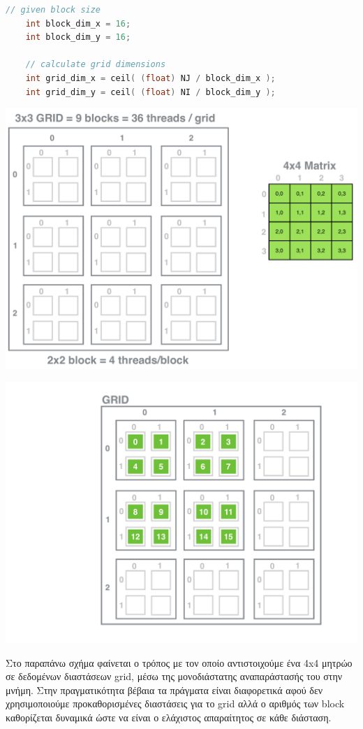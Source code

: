 \vspace{0.3cm}

\newpage

\begin{lstlisting}[language=C]
    // given block size
	int block_dim_x = 16;
	int block_dim_y = 16;

	// calculate grid dimensions
	int grid_dim_x = ceil( (float) NJ / block_dim_x );
	int grid_dim_y = ceil( (float) NI / block_dim_y );
\end{lstlisting}

\begin{center}
    \includegraphics[scale=0.35]{./figures/1_conv/grid-matrix}
\end{center}

\begin{center}
    \includegraphics[scale=0.35]{./figures/1_conv/final-grid}
\end{center}

Στο παραπάνω σχήμα φαίνεται ο τρόπος με τον οποίο αντιστοιχούμε ένα 4x4 μητρώο σε δεδομένων διαστάσεων grid, μέσω της μονοδιάστατης αναπαράστασής του στην μνήμη. Στην πραγματικότητα βέβαια τα πράγματα είναι διαφορετικά αφού δεν χρησιμοποιούμε προκαθορισμένες διαστάσεις για το grid αλλά ο αριθμός των block καθορίζεται δυναμικά ώστε να είναι ο ελάχιστος απαραίτητος σε κάθε διάσταση.

\newpage